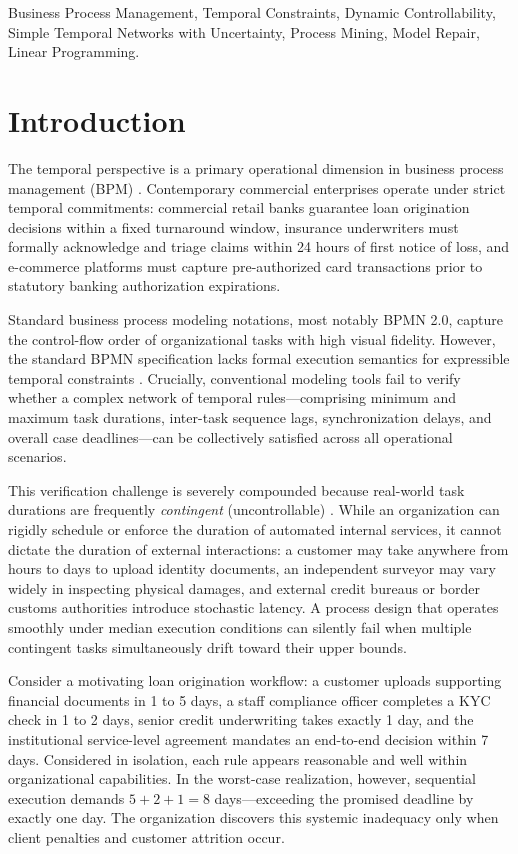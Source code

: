 \documentclass[conference]{IEEEtran}
\begin{document}
\begin{IEEEkeywords}
Business Process Management, Temporal Constraints, Dynamic Controllability, Simple Temporal Networks with Uncertainty, Process Mining, Model Repair, Linear Programming.
\end{IEEEkeywords}

\section{Introduction}
\label{sec:intro}

The temporal perspective is a primary operational dimension in business process management (BPM) \cite{cheikhrouhou2015, eder2020}. Contemporary commercial enterprises operate under strict temporal commitments: commercial retail banks guarantee loan origination decisions within a fixed turnaround window, insurance underwriters must formally acknowledge and triage claims within 24 hours of first notice of loss, and e-commerce platforms must capture pre-authorized card transactions prior to statutory banking authorization expirations.

Standard business process modeling notations, most notably BPMN 2.0, capture the control-flow order of organizational tasks with high visual fidelity. However, the standard BPMN specification lacks formal execution semantics for expressible temporal constraints \cite{ocampo2022}. Crucially, conventional modeling tools fail to verify whether a complex network of temporal rules—comprising minimum and maximum task durations, inter-task sequence lags, synchronization delays, and overall case deadlines—can be collectively satisfied across all operational scenarios.

This verification challenge is severely compounded because real-world task durations are frequently \textit{contingent} (uncontrollable) \cite{vidal1999}. While an organization can rigidly schedule or enforce the duration of automated internal services, it cannot dictate the duration of external interactions: a customer may take anywhere from hours to days to upload identity documents, an independent surveyor may vary widely in inspecting physical damages, and external credit bureaus or border customs authorities introduce stochastic latency. A process design that operates smoothly under median execution conditions can silently fail when multiple contingent tasks simultaneously drift toward their upper bounds.

Consider a motivating loan origination workflow: a customer uploads supporting financial documents in 1 to 5 days, a staff compliance officer completes a KYC check in 1 to 2 days, senior credit underwriting takes exactly 1 day, and the institutional service-level agreement mandates an end-to-end decision within 7 days. Considered in isolation, each rule appears reasonable and well within organizational capabilities. In the worst-case realization, however, sequential execution demands $5 + 2 + 1 = 8$ days—exceeding the promised deadline by exactly one day. The organization discovers this systemic inadequacy only when client penalties and customer attrition occur.
\end{document}
